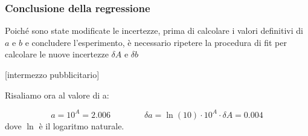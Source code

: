 \subsubsection{Conclusione della regressione}

Poiché sono state modificate le incertezze, prima di calcolare i valori definitivi di $a$ e $b$ e concludere l'esperimento,
è necessario ripetere la procedura di fit per calcolare le nuove incertezze $\delta A$ e $\delta b$

[intermezzo pubblicitario]

Risaliamo ora al valore di a:

\begin{equation}
    a = 10^A = 2.006 \qquad \qquad \delta a = \ln(10) \cdot 10^A \cdot \delta A = 0.004
\end{equation}
%
dove $\ln$ è il logaritmo naturale.
